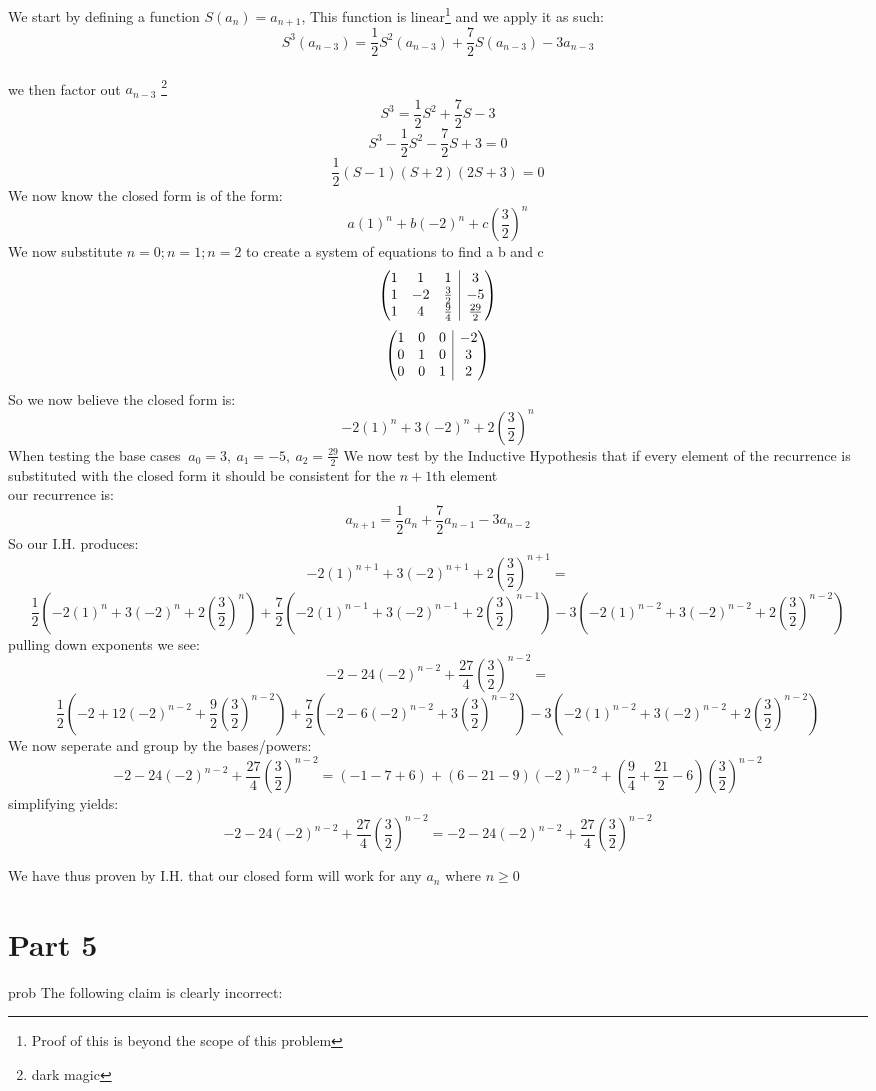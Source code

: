\documentclass{article}
\makeatletter
\newcounter{prob}\setcounter{prob}{1}\newcommand{\prob}{\arabic{prob}.\indent \addtocounter{prob}{1}}
\newenvironment{amatrix}[1]{%
	\left(\begin{array}{@{}*{#1}{c}|c@{}}
	}{%
\end{array}\right)
}
\makeatother
\begin{document}
We start by defining a function $S(a_n) =a_{n+1}$, This function is linear\footnote{Proof of this is beyond the scope of this problem} and we apply it as such:
$$S^3(a_{n-3})= \frac{1}{2}S^2(a_{n-3})+\frac{7}{2}S(a_{n-3})-3a_{n-3}$$\\
we then factor out $a_{n-3}$ \footnote{dark magic}
$$S^3= \frac{1}{2}S^2+\frac{7}{2}S-3$$
$$S^3 -\frac{1}{2}S^2-\frac{7}{2}S+3=0$$
$$\frac{1}{2}(S-1)(S+2)(2S+3)=0$$
We now know the closed form is of the form:
$$a(1)^n+b(-2)^n+c(\frac{3}{2})^n$$
We now substitute $n=0;n=1;n=2$ to create a system of equations to find a b and c
$$\begin{amatrix}{3}
	1 & 1 & 1 & 3 \\  1 & -2 & \frac{3}{2} & -5 \\ 1 & 4 & \frac{9}{4} & \frac{29}{2} 
\end{amatrix}$$
$$\begin{amatrix}{3}
1 & 0 & 0 & -2 \\  0 & 1 & 0 & 3 \\ 0 & 0 & 1 & 2 
\end{amatrix}$$
So we now believe the closed form is:
$$-2(1)^n+3(-2)^n+2(\frac{3}{2})^n$$
When testing the base cases $\ a_0=3,\ a_1=-5,\ a_2=\frac{29}{2}$
We now test by the Inductive Hypothesis that if every element of the recurrence is substituted with the closed form it should be consistent for the $n+1$th element\\
our recurrence is:
$$a_{n+1}= \frac{1}{2}a_{n}+\frac{7}{2}a_{n-1}-3a_{n-2}$$
So our I.H. produces:
$$-2(1)^{n+1}+3(-2)^{n+1}+2(\frac{3}{2})^{n+1}=$$$$ \frac{1}{2}(-2(1)^{n}+3(-2)^{n}+2(\frac{3}{2})^{n})+\frac{7}{2}(-2(1)^{n-1}+3(-2)^{n-1}+2(\frac{3}{2})^{n-1})-3(-2(1)^{n-2}+3(-2)^{n-2}+2(\frac{3}{2})^{n-2})$$
pulling down exponents we see:
$$-2-24(-2)^{n-2}+\frac{27}{4}(\frac{3}{2})^{n-2}=$$$$ \frac{1}{2}(-2+12(-2)^{n-2}+\frac{9}{2}(\frac{3}{2})^{n-2})+\frac{7}{2}(-2-6(-2)^{n-2}+3(\frac{3}{2})^{n-2})-3(-2(1)^{n-2}+3(-2)^{n-2}+2(\frac{3}{2})^{n-2})$$
We now seperate and group by the bases/powers:
$$-2-24(-2)^{n-2}+\frac{27}{4}(\frac{3}{2})^{n-2}=(-1-7+6) +(6-21-9)(-2)^{n-2}+(\frac{9}{4}+\frac{21}{2}-6)(\frac{3}{2})^{n-2}$$
simplifying yields: 
$$-2-24(-2)^{n-2}+\frac{27}{4}(\frac{3}{2})^{n-2}=-2 -24(-2)^{n-2} +\frac{27}{4}(\frac{3}{2})^{n-2}$$

We have thus proven by I.H. that our closed form will work for any $a_n$ where $n\geq0$

\newpage
\section{Part 5}
prob The following claim is clearly incorrect:\\
\end{document}
